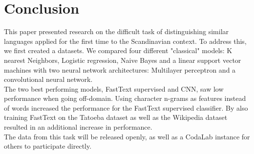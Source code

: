 \section{Conclusion}
This paper presented research on the difficult task of distinguishing similar languages applied for the first time to the Scandinavian context. To address this, we first created a datasets.  We compared four different "classical" models: K nearest Neighbors, Logistic regression, Naive Bayes and a linear support vector machines with two neural network architectures: Multilayer perceptron and a convolutional neural network.\\

The two best performing models, FastText supervised and CNN, saw low performance when going off-domain. Using character n-grams as features instead of words increased the performance for the FastText supervised classifier. By also training FastText on the Tatoeba dataset as well as the Wikipedia dataset resulted in an additional increase in performance.\\

The data from this task will be released openly, as well as a CodaLab instance for others to participate directly.

